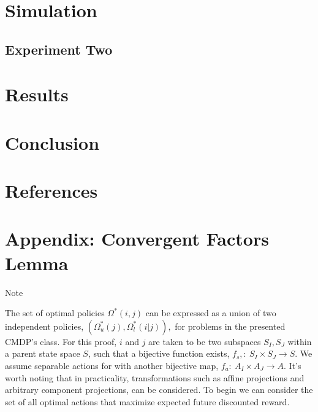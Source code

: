 \documentclass[compsoc,journal,letterpaper,10pt,draftclsnofoot,onecolumn]{IEEEtran}
\begin{document}
\label{compensation-for-action-space-factorization-1}

\section{}\label{section-1}

\section{Simulation}\label{simulation-1}

\subsection{Experiment Two}\label{experiment-two}

\section{Results}\label{results}

\section{Conclusion}\label{conclusion}

\section{References}\label{references}

\section{Appendix: Convergent Factors
Lemma}\label{appendix-convergent-factors-lemma}

Note

The set of optimal policies \(\Omega_{\ }^{*}\left( i,j \right)\) can be
expressed as a union of two independent policies,
\(\left( \Omega_{u}^{*}\left( j \right),\Omega_{l}^{*}\left( i|j \right) \right),\)
for problems in the presented CMDP's class. For this proof, \(i\) and
\(j\) are taken to be two subspaces \(S_{I},S_{J}\) within a parent
state space \(S\), such that a bijective function exists,
\(f_{s},:\ S_{I} \times S_{J} \rightarrow S.\) We assume separable
actions for with another bijective map,
\(f_{a}:\ A_{I} \times A_{J} \rightarrow A\). It's worth noting that in
practicality, transformations such as affine projections and arbitrary
component projections, can be considered. To begin we can consider the
set of all optimal actions that maximize expected future discounted
reward.
\end{document}
